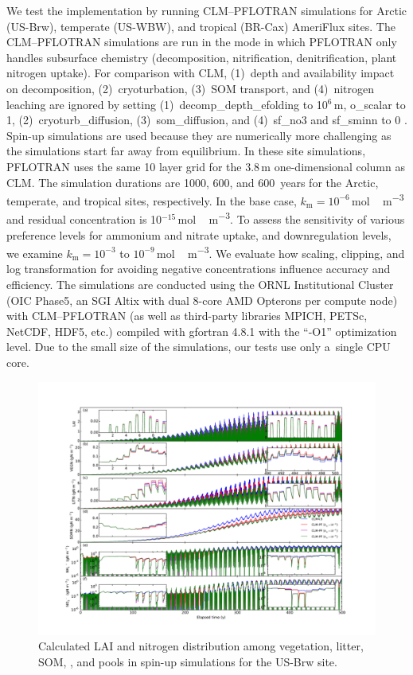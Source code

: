 \documentclass[gmd,noline]{copernicus}
\begin{document}
      We test the implementation by running CLM--PFLOTRAN simulations for
      Arctic (US-Brw), temperate (US-WBW), and tropical (BR-Cax) AmeriFlux
      sites. The CLM--PFLOTRAN simulations are run in the mode in which
      PFLOTRAN only handles subsurface chemistry (decomposition,
      nitrification, denitrification, plant nitrogen uptake). For comparison
      with CLM, (1)~depth and  availability impact on
      decomposition, (2)~cryoturbation, (3)~SOM transport, and (4)~nitrogen
      leaching are ignored by setting (1)~decomp\_depth\_efolding to
      10$^6$\,m, o\_scalar to 1, (2)~cryoturb\_diffusion,
      (3)~som\_diffusion, and (4)~sf\_no3 and sf\_sminn to 0
      \citep{Oleson2013}. Spin-up simulations are used because they are
      numerically more challenging as the simulations start far away from
      equilibrium. In these site simulations, PFLOTRAN uses the same 10
      layer grid for the 3.8\,m one-dimensional column as CLM. The
      simulation durations are 1000, 600, and 600~years for the Arctic,
      temperate, and tropical sites, respectively.  In the base case,
      $k_\mathrm{m}=10^{-6}$\,\unit{mol\,m^{-3}} and residual concentration
      is 10$^{-15}$\,\unit{mol\,m^{-3}}. To assess the sensitivity of
      various preference levels for ammonium and nitrate uptake, and
      downregulation levels, we examine $k_\mathrm{m}=10^{-3}$ to
      $10^{-9}$\,\unit{mol\,m^{-3}}. We evaluate how scaling, clipping, and
      log transformation for avoiding negative concentrations influence
      accuracy and efficiency.  The simulations are conducted using the ORNL
      Institutional Cluster (OIC Phase5, an SGI Altix with dual 8-core AMD
      Opterons per compute node) with CLM--PFLOTRAN (as well as third-party
      libraries MPICH, PETSc, NetCDF, HDF5, etc.) compiled with gfortran
      4.8.1 with the ``-O1'' optimization level.  Due to the small size of
      the simulations, our tests use only a~single CPU core.

\begin{figure}[t]
\includegraphics[width=130mm]{gmd-2015-254-f04.pdf}
\caption{Calculated LAI and nitrogen distribution among vegetation, litter,
SOM, , and  pools in spin-up simulations for the
US-Brw site.} \label{fig:brw500yl}
\end{figure}
\end{document}

